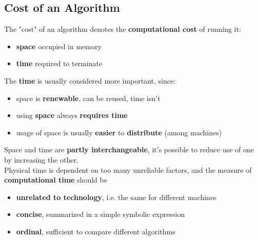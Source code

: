 \documentclass[11pt]{article}
\begin{document}
	\newpage
	
	\subsection{Cost of an Algorithm}
	The "cost" of an algorithm denotes the \textbf{computational cost} of running it: 
	\begin{itemize}
		\item \textbf{space} occupied in memory
		\item \textbf{time} required to terminate
	\end{itemize}
	The \textbf{time} is usually considered more important, since: 
	\begin{itemize}
		\item space is \textbf{renewable}, can be reused, time isn't 
		\item using \textbf{space} always \textbf{requires time}
		\item usage of space is usually \textbf{easier} to \textbf{distribute} (among machines)
	\end{itemize}
	Space and time are \textbf{partly interchangeable}, it's possible to reduce use of one by increasing the other.\\
	
	Physical time is dependent on too many unreliable factors, and the measure of \textbf{computational time} should be 
	\begin{itemize}
		\item \textbf{unrelated to technology}, i.e. the same for different machines
		\item \textbf{concise}, summarized in a simple symbolic expression
		\item \textbf{ordinal}, sufficient to compare different algorithms
	\end{itemize}
	
	\newpage
	
\end{document}
